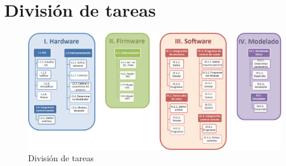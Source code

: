 \documentclass[spanish,12pt,a4paper,titlepage]{report}
\begin{document}
\chapter{División de tareas}

\begin{figure}[h!]
	\centering
	\includegraphics[width=1\textwidth]{./division.png}
	\caption{División de tareas}
	\label{fig:div}
\end{figure}
\end{document}
